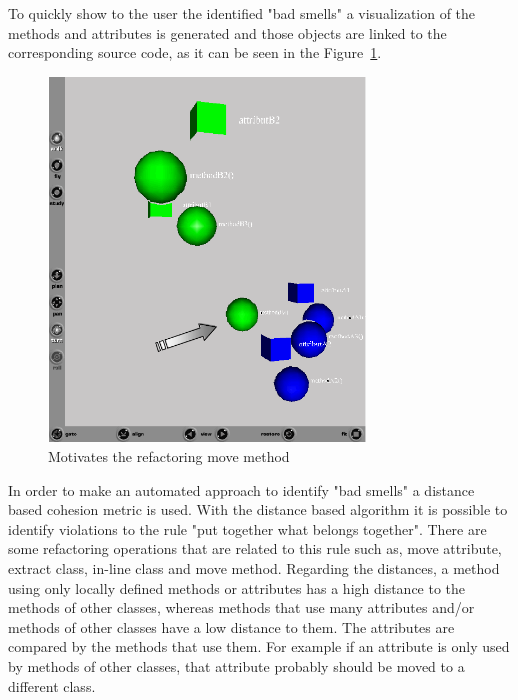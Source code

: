 
To quickly show to the user the identified "bad smells" a visualization of the methods and attributes is generated and those objects are linked to the corresponding source code, as it can be seen in the Figure~\ref{fig:MetricsBasedRefactoring}.

\begin{figure}[h!]
  \centering
  \includegraphics[width=0.75\textwidth]{img/metricsbasedrefactoring.png}
  \caption{Motivates the refactoring move method}
  \label{fig:MetricsBasedRefactoring}
\end{figure}

In order to make an automated approach to identify "bad smells" a distance based cohesion metric is used.
With the distance based algorithm it is possible to identify violations to the rule "put together what belongs together".
There are some refactoring operations that are related to this rule such as, move attribute, extract class, in-line class and move method.
Regarding the distances, a method using only locally defined methods or attributes has a high distance to the methods of other classes, whereas methods that use many attributes and/or methods of other classes have a low distance to them.
The attributes are compared by the methods that use them.
For example if an attribute is only used by methods of other classes, that attribute probably should be moved to a different class.

